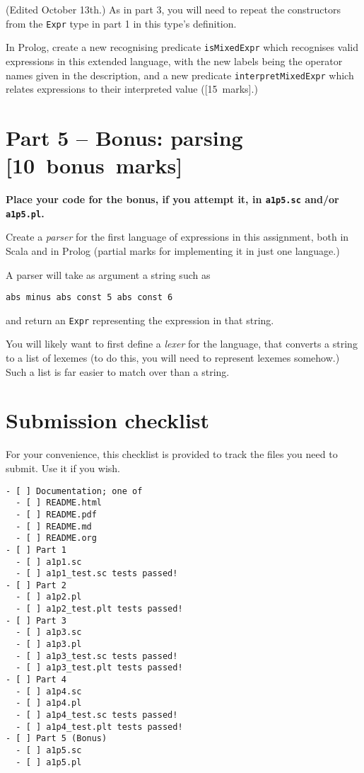 \documentclass[11pt]{article}
\begin{document}
(Edited October 13th.)
As in part 3, you will need to repeat the constructors from the
\texttt{Expr} type in part 1 in this type's definition.

In Prolog, create a new recognising predicate \texttt{isMixedExpr} which
recognises valid expressions in this extended language,
with the new labels being the operator names given in the description,
and a new predicate \texttt{interpretMixedExpr} which relates
expressions to their interpreted value ([15 marks].)

\section*{Part 5 – Bonus: parsing                [10 bonus marks]}
\label{sec:org43119c8}
\begin{center}
\textbf{Place your code for the bonus, if you attempt it, in \texttt{a1p5.sc} and/or \texttt{a1p5.pl}.}
\end{center}

Create a \emph{parser} for the first language of expressions
in this assignment, both in Scala and in Prolog
(partial marks for implementing it in just one language.)

A parser will take as argument a string such as
\begin{verbatim}
abs minus abs const 5 abs const 6
\end{verbatim}
and return an \texttt{Expr} representing the expression in that string.

You will likely want to first define a \emph{lexer} for the language,
that converts a string to a list of lexemes
(to do this, you will need to represent lexemes somehow.)
Such a list is far easier to match over than a string.

\section*{Submission checklist}
\label{sec:orgeec4e5d}
For your convenience, this checklist is provided
to track the files you need to submit.
Use it if you wish.
\begin{verbatim}
- [ ] Documentation; one of
  - [ ] README.html
  - [ ] README.pdf
  - [ ] README.md
  - [ ] README.org
- [ ] Part 1
  - [ ] a1p1.sc
  - [ ] a1p1_test.sc tests passed!
- [ ] Part 2
  - [ ] a1p2.pl
  - [ ] a1p2_test.plt tests passed!
- [ ] Part 3
  - [ ] a1p3.sc
  - [ ] a1p3.pl
  - [ ] a1p3_test.sc tests passed!
  - [ ] a1p3_test.plt tests passed!
- [ ] Part 4
  - [ ] a1p4.sc
  - [ ] a1p4.pl
  - [ ] a1p4_test.sc tests passed!
  - [ ] a1p4_test.plt tests passed!
- [ ] Part 5 (Bonus)
  - [ ] a1p5.sc
  - [ ] a1p5.pl
\end{verbatim}
\end{document}
